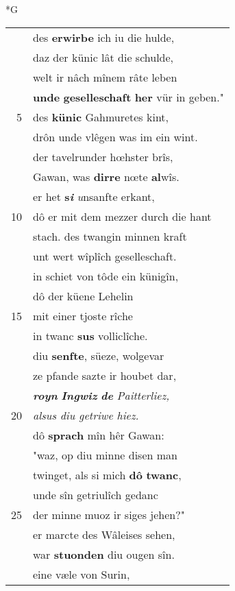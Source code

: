 \documentclass[8pt,a4paper,notitlepage]{article}
\begin{document}
\newpage
\begin{table}[ht]
\begin{minipage}[t]{0.5\linewidth}
\small
\begin{center}*G
\end{center}
\begin{tabular}{rl}
 & des \textbf{erwirbe} ich iu die hulde,\\ 
 & daz der künic lât die schulde,\\ 
 & welt ir nâch mînem râte leben\\ 
 & \textbf{unde} \textbf{geselleschaft} \textbf{her} vür in geben."\\ 
5 & des \textbf{künic} Gahmuretes kint,\\ 
 & drôn unde vlêgen was im ein wint.\\ 
 & der tavelrunder hœhster brîs,\\ 
 & Gawan, was \textbf{dirre} nœte \textbf{al}wîs.\\ 
 & er het \textbf{s\textit{i}} \textit{u}nsanfte erkant,\\ 
10 & dô er mit dem mezzer durch die hant\\ 
 & stach. des twangin minnen kraft\\ 
 & unt wert wîplîch geselleschaft.\\ 
 & in schiet von tôde ein künigîn,\\ 
 & dô der küene Lehelin\\ 
15 & mit einer tjoste rîche\\ 
 & in twanc \textbf{sus} volliclîche.\\ 
 & diu \textbf{senfte}, süeze, wolgevar\\ 
 & ze pfande sazte ir houbet dar,\\ 
 & \textit{\textbf{royn}} \textit{\textbf{Ingwiz}} \textit{\textbf{de} Paitterliez,}\\ 
20 & \textit{alsus diu getriwe hiez.}\\ 
 & dô \textbf{sprach} mîn hêr Gawan:\\ 
 & "waz, op diu minne disen man\\ 
 & twinget, als si mich \textbf{dô} \textbf{twanc},\\ 
 & unde sîn getriulîch gedanc\\ 
25 & der minne muoz ir siges jehen?"\\ 
 & er marcte des Wâleises sehen,\\ 
 & war \textbf{stuonden} diu ougen sîn.\\ 
 & eine væle von Surin,\\ 

\end{tabular}
\end{minipage}
\end{table}
\end{document}
